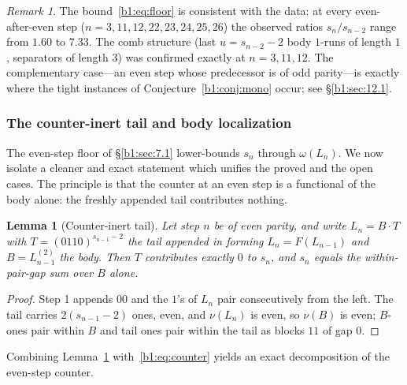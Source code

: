 \documentclass[a4paper]{article}
\theoremstyle{plain}
\newtheorem{lemma}{Lemma}[subsection]
\theoremstyle{definition}
\theoremstyle{remark}
\newtheorem{remark}{Remark}[subsection]
\begin{document}
\begin{remark}\label{b1:rem:floor-consistent}
The bound~\eqref{b1:eq:floor} is consistent with the data: at every even-after-even step ($n=3,11,12,22,23,24,25,26$) the observed ratios $s_n/s_{n-2}$ range from $1.60$ to $7.33$. The comb structure (last $u=s_{n-2}-2$ body $1$-runs of length $1$, separators of length $3$) was confirmed exactly at $n=3,11,12$. The complementary case---an even step whose predecessor is of odd parity---is exactly where the tight instances of Conjecture~\ref{b1:conj:mono} occur; see \S\ref{b1:sec:12.1}.
\end{remark}

\subsubsection{The counter-inert tail and body localization}\label{b1:sec:inert}
The even-step floor of \S\ref{b1:sec:7.1} lower-bounds $s_n$ through $\omega(L_n)$. We now isolate a cleaner and exact statement which unifies the proved and the open cases. The principle is that the counter at an even step is a functional of the body alone: the freshly appended tail contributes nothing.

\begin{lemma}[Counter-inert tail]\label{b1:lem:inert}
Let step $n$ be of even parity, and write $L_n=B\cdot T$ with $T=(0110)^{s_{n-1}-2}$ the tail appended in forming $L_n=F(L_{n-1})$ and $B=L^{(2)}_{n-1}$ the body. Then $T$ contributes exactly $0$ to $s_n$, and $s_n$ equals the within-pair-gap sum over $B$ alone.
\end{lemma}
\begin{proof}
Step 1 appends $00$ and the $1$'s of $L_n$ pair consecutively from the left. The tail carries $2(s_{n-1}-2)$ ones, even, and $\nu(L_n)$ is even, so $\nu(B)$ is even; $B$-ones pair within $B$ and tail ones pair within the tail as blocks $11$ of gap $0$.
\end{proof}

Combining Lemma~\ref{b1:lem:inert} with~\eqref{b1:eq:counter} yields an exact decomposition of the even-step counter.
\end{document}
